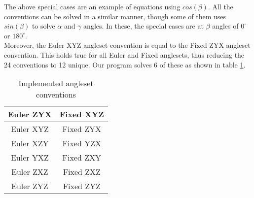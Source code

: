 The above special cases are an example of equations using $cos(\beta)$. All the conventions can be solved in a similar manner, though some of them uses $sin(\beta)$ to solve $\alpha$ and $\gamma$ angles. In these, the special cases are at $\beta$ angles of $0^{\circ}$ or $180^{\circ}$.\\
Moreover, the Euler XYZ angleset convention is equal to the Fixed ZYX angleset convention. This holds true for all Euler and Fixed anglesets, thus reducing the 24 conventions to 12 unique. Our program solves 6 of these as shown in table \ref{tab:anglesets}.

\begin{table}[H]%
\centering
\begin{tabular}{|c|c|}
\hline
Euler ZYX & Fixed XYZ \\
\hline
Euler XYZ & Fixed ZYX \\
\hline
Euler XZY & Fixed YZX \\
\hline
Euler YXZ & Fixed ZXY \\
\hline
Euler ZXZ & Fixed ZXZ \\
\hline
Euler ZYZ & Fixed ZYZ \\
\hline
\end{tabular}
\caption{Implemented angleset conventions}
\label{tab:anglesets}
\end{table}

